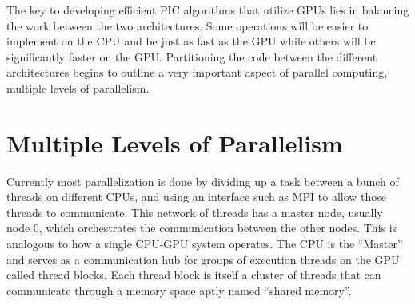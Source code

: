 The key to developing efficient PIC algorithms that utilize GPUs lies in balancing the work between the two architectures. Some operations will be easier to implement on the CPU and be just as fast as the GPU while others will be significantly faster on the GPU. Partitioning the code between the different architectures begins to outline a very important aspect of parallel computing, multiple levels of parallelism.

	\section{Multiple Levels of Parallelism}
	Currently most parallelization is done by dividing up a task between a bunch of threads on different CPUs, and using an interface such as MPI to allow those threads to communicate. This network of threads has a master node, usually node 0, which orchestrates the communication between the other nodes. This is analogous to how a single CPU-GPU system operates. The CPU is the ``Master'' and serves as a communication hub for groups of execution threads on the GPU called thread blocks. Each thread block is itself a cluster of threads that can communicate through a memory space aptly named ``shared memory''.

